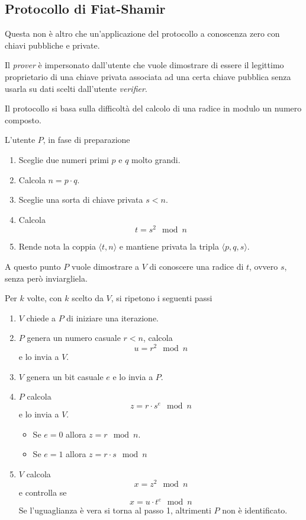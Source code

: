 \subsection{Protocollo di Fiat-Shamir}
Questa non \`e altro che un'applicazione del protocollo a conoscenza zero con chiavi pubbliche e private.

Il \emph{prover} \`e impersonato dall'utente che vuole dimostrare di essere il legittimo proprietario di una chiave
privata associata ad una certa chiave pubblica senza usarla su dati scelti dall'utente \emph{verifier}.

Il protocollo si basa sulla difficolt\`a del calcolo di una radice in modulo un numero composto.

L'utente $P$, in fase di preparazione
\begin{enumerate}
	\item Sceglie due numeri primi $p$ e $q$ molto grandi.
	\item Calcola $n = p \cdot q$.
	\item Sceglie una sorta di chiave privata $s < n$.
	\item Calcola
	      \[ t = s^2 \mod{n} \]
	\item Rende nota la coppia $\langle t, n \rangle$ e mantiene privata la tripla $\langle p, q, s \rangle$.
\end{enumerate}
A questo punto $P$ vuole dimostrare a $V$ di conoscere una radice di $t$, ovvero $s$, senza per\`o inviargliela.

Per $k$ volte, con $k$ scelto da $V$, si ripetono i seguenti passi
\begin{enumerate}
	\item $V$ chiede a $P$ di iniziare una iterazione.
	\item $P$ genera un numero casuale $r < n$, calcola
	      \[ u = r^2 \mod{n} \]
	      e lo invia a $V$.
	\item $V$ genera un bit casuale $e$ e lo invia a $P$.
	\item $P$ calcola
	      \[ z = r \cdot s^e \mod{n} \]
	      e lo invia a $V$.
	      \begin{itemize}
		      \item Se $e = 0$ allora $z = r \mod{n}$.
		      \item Se $e = 1$ allora $z = r \cdot s \mod{n}$
	      \end{itemize}
	\item $V$ calcola
	      \[ x = z^2 \mod{n} \]
	      e controlla se
	      \[ x = u \cdot t^e \mod{n} \]
	      Se l'uguaglianza \`e vera si torna al passo 1, altrimenti $P$ non \`e identificato.
\end{enumerate}

